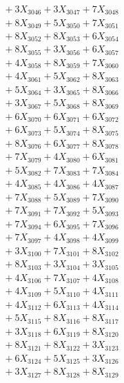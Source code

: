 \documentclass[a4paper,10pt]{article}
\begin{document}
{\begin{align}
&\;  + 3 X_{3046} + 3 X_{3047} + 7 X_{3048} \\[0.3ex]
&\;  + 8 X_{3049} + 5 X_{3050} + 7 X_{3051} \\[0.3ex]
&\;  + 8 X_{3052} + 8 X_{3053} + 6 X_{3054} \\[0.3ex]
&\;  + 8 X_{3055} + 3 X_{3056} + 6 X_{3057} \\[0.3ex]
&\;  + 4 X_{3058} + 8 X_{3059} + 7 X_{3060} \\[0.3ex]
&\;  + 4 X_{3061} + 5 X_{3062} + 8 X_{3063} \\[0.3ex]
&\;  + 5 X_{3064} + 3 X_{3065} + 8 X_{3066} \\[0.3ex]
&\;  + 3 X_{3067} + 5 X_{3068} + 8 X_{3069} \\[0.5ex]\allowbreak
&\;  + 6 X_{3070} + 6 X_{3071} + 6 X_{3072} \\[0.3ex]
&\;  + 6 X_{3073} + 5 X_{3074} + 8 X_{3075} \\[0.3ex]
&\;  + 8 X_{3076} + 6 X_{3077} + 8 X_{3078} \\[0.3ex]
&\;  + 7 X_{3079} + 4 X_{3080} + 6 X_{3081} \\[0.3ex]
&\;  + 5 X_{3082} + 7 X_{3083} + 7 X_{3084} \\[0.3ex]
&\;  + 4 X_{3085} + 4 X_{3086} + 4 X_{3087} \\[0.3ex]
&\;  + 7 X_{3088} + 5 X_{3089} + 7 X_{3090} \\[0.3ex]
&\;  + 7 X_{3091} + 7 X_{3092} + 5 X_{3093} \\[0.3ex]
&\;  + 7 X_{3094} + 6 X_{3095} + 7 X_{3096} \\[0.3ex]
&\;  + 7 X_{3097} + 4 X_{3098} + 4 X_{3099} \\[0.5ex]\allowbreak
&\;  + 3 X_{3100} + 7 X_{3101} + 8 X_{3102} \\[0.3ex]
&\;  + 8 X_{3103} + 3 X_{3104} + 3 X_{3105} \\[0.3ex]
&\;  + 4 X_{3106} + 7 X_{3107} + 4 X_{3108} \\[0.3ex]
&\;  + 4 X_{3109} + 5 X_{3110} + 4 X_{3111} \\[0.3ex]
&\;  + 4 X_{3112} + 6 X_{3113} + 4 X_{3114} \\[0.3ex]
&\;  + 5 X_{3115} + 8 X_{3116} + 8 X_{3117} \\[0.3ex]
&\;  + 3 X_{3118} + 6 X_{3119} + 8 X_{3120} \\[0.3ex]
&\;  + 8 X_{3121} + 8 X_{3122} + 3 X_{3123} \\[0.3ex]
&\;  + 6 X_{3124} + 5 X_{3125} + 3 X_{3126} \\[0.3ex]
&\;  + 3 X_{3127} + 8 X_{3128} + 8 X_{3129} \\[0.5ex]\allowbreak

\end{align}}
\end{document}
